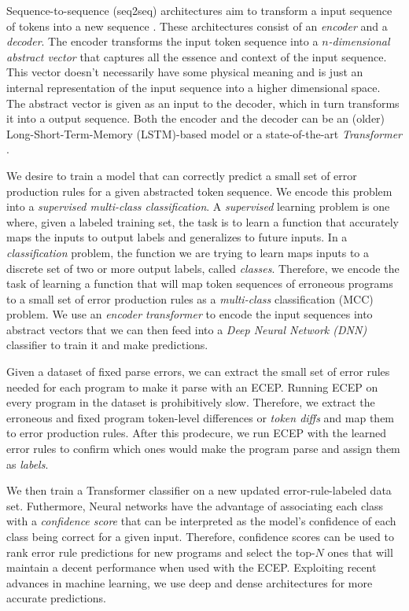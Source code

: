  Sequence-to-sequence (seq2seq) architectures aim to
transform a input sequence of tokens into a new sequence \citep{Sutskever_2014}.
These architectures consist of an \emph{encoder} and a \emph{decoder}. The
encoder transforms the input token sequence into a \emph{$n$-dimensional
abstract vector} that captures all the essence and context of the input
sequence. This vector doesn't necessarily have some physical meaning and is just
an internal representation of the input sequence into a higher dimensional
space. The abstract vector is given as an input to the decoder, which in turn
transforms it into a output sequence. Both the encoder and the decoder can be an
(older) Long-Short-Term-Memory (LSTM)-based model \citep{Hochreiter_1997} or a
state-of-the-art \emph{Transformer} \citep{Vaswani_2017}.

 We desire to train a model that can correctly
predict a small set of error production rules for a given abstracted token
sequence. We encode this problem into a \emph{supervised multi-class
classification}. A \emph{supervised} learning problem is one where, given a
labeled training set, the task is to learn a function that accurately maps the
inputs to output labels and generalizes to future inputs. In a
\emph{classification} problem, the function we are trying to learn maps inputs
to a discrete set of two or more output labels, called \emph{classes}.
Therefore, we encode the task of learning a function that will map token
sequences of erroneous programs to a small set of error production rules as a
\emph{multi-class} classification (MCC) problem. We use an \emph{encoder
transformer} to encode the input sequences into abstract vectors that we can
then feed into a \emph{Deep Neural Network (DNN)} classifier to train it and
make predictions.

Given a dataset of fixed parse errors, we can extract the small set of error
rules needed for each program to make it parse with an ECEP. Running ECEP on
every program in the dataset is prohibitively slow. Therefore, we extract the
erroneous and fixed program token-level differences or \emph{token diffs} and
map them to error production rules. After this prodecure, we run ECEP with the
learned error rules to confirm which ones would make the program parse and
assign them as \emph{labels}.

We then train a Transformer classifier on a new updated error-rule-labeled data
set. Futhermore, Neural networks have the advantage of associating each class
with a \emph{confidence score} that can be interpreted as the model's confidence
of each class being correct for a given input. Therefore, confidence scores can
be used to rank error rule predictions for new programs and select the top-$N$
ones that will maintain a decent performance when used with the ECEP. Exploiting
recent advances in machine learning, we use deep and dense architectures
\citep{Schmidhuber_2015} for more accurate predictions.
